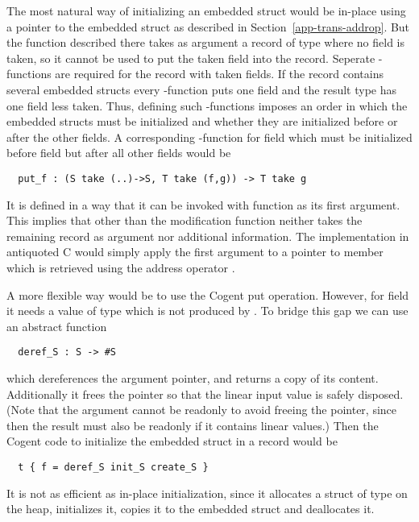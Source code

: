 The most natural way of initializing an embedded struct would be in-place using a pointer to the embedded struct as described
in Section~\ref{app-trans-addrop}. But the function  described there takes as argument a record of type 
where no field is taken, so it cannot be used to put the taken field  into the record. Seperate -functions
are required for the record with taken fields. If the record contains several embedded structs every -function
puts one field and the result type has one field less taken. Thus, defining such -functions imposes an order
in which the embedded structs must be initialized and whether they are initialized before or after the other fields. A corresponding
-function for field  which must be initialized before field  but after all other fields would be
\begin{verbatim}
  put_f : (S take (..)->S, T take (f,g)) -> T take g
\end{verbatim}
It is defined in a way that it can be invoked with function  as its first argument. This implies that other than
 the modification function neither takes the remaining record as argument nor additional information.
The implementation in antiquoted C would simply apply the first argument to a pointer to member  which is retrieved
using the address operator \code{\&}.

A more flexible way would be to use the Cogent put operation. However, for field  it needs a value of type 
 which is not produced by . To bridge this gap we can use an abstract function
\begin{verbatim}
  deref_S : S -> #S
\end{verbatim}
which dereferences the argument pointer, and returns a copy of its content. Additionally it frees the pointer so that the
linear input value is safely disposed. (Note that the argument cannot be readonly to avoid freeing the pointer, since then
the result must also be readonly if it contains linear values.) Then the Cogent code to initialize the embedded struct 
 in a record  would be
\begin{verbatim}
  t { f = deref_S init_S create_S }
\end{verbatim}
It is not as efficient as in-place initialization, since it allocates a struct of type  on the heap, initializes it,
copies it to the embedded struct  and deallocates it.

